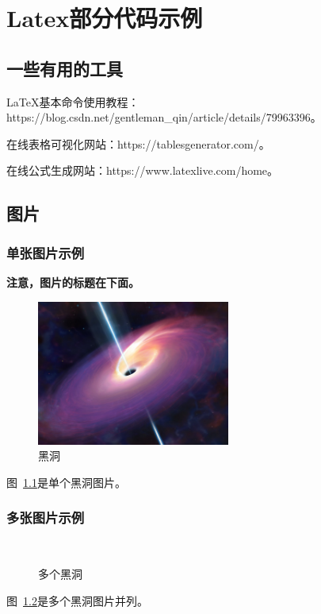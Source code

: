 \thispagestyle{main}
\chapter{Latex部分代码示例}
\thispagestyle{main}


\section{一些有用的工具}

LaTeX基本命令使用教程：https://blog.csdn.net/gentleman\_qin/article/details/79963396。

在线表格可视化网站：https://tablesgenerator.com/。

在线公式生成网站：https://www.latexlive.com/home。


\section{图片}

\subsection{单张图片示例}

\textbf{注意，图片的标题在下面。}
\begin{figure}[!ht]
    \centering
    \includegraphics[width=2.5in]{images/blackhole.jpeg}
    \caption{黑洞}
    \label{fig:blackhole1}
\end{figure}
图~\ref{fig:blackhole1}是单个黑洞图片。

\subsection{多张图片示例}

\begin{figure}[!ht]
    \centering
    \hfill
    \\
    \hfill
    \caption{多个黑洞}
    \label{fig:blackhole2}
\end{figure}
图~\ref{fig:blackhole2}是多个黑洞图片并列。


